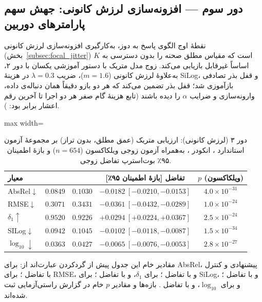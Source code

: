 \subsection{دور سوم --- افزونه‌سازی لرزش کانونی: جهش سهم پارامترهای دوربین}
\label{subsec:focal_jitter_results}

نقطهٔ اوج الگوی پاسخ به دوز، به‌کارگیری افزونه‌سازی لرزش کانونی (بخش~\ref{subsec:focal_jitter}) است که مقیاس مطلق صحنه را بدون دسترسی به $K$ اساساً غیرقابل بازیابی می‌کند. زوج مدل  متریک با دستور آموزشی یکسان با دور ۲، به‌علاوهٔ لرزش کانونی ($m=1.6$)، ضریب $\lambda=0.3$ در هزینهٔ SiLog، و قفل بذر تصادفی بازآموزی شد؛ قفل بذر تضمین می‌کند که هر دو بازو دقیقاً همان دنباله‌ی داده، وارونه‌سازی و ضرایب $\alpha$ را دیده باشند (تابع هزینهٔ گام صفر هر دو اجرا تا آخرین رقم اعشار برابر بود: ).

\begin{table}[htbp]
\centering
\caption{دور ۳ (لرزش کانونی): ارزیابی متریک (عمق مطلق، بدون تراز) بر مجموعهٔ آزمون استاندارد ، انکودر ، به‌همراه آزمون زوجی ویلکاکسون ($n=654$) و بازهٔ اطمینان ۹۵٪ بوت‌استرپ تفاضل زوجی.}
\label{tab:nyu_metric_focal}
\small
\begin{adjustbox}{max width=\textwidth}
\begin{tabular}{lcccc}
\hline
معیار & \tableproposedmodel{} & \tablecontrolmodel{} & تفاضل [بازهٔ اطمینان ۹۵٪] & $p$ (ویلکاکسون) \\ \hline
AbsRel$\downarrow$ & $\mathbf{0.0849}$ & $0.1030$ & $-0.0182\ [-0.0210, -0.0153]$ & $4.0\times10^{-31}$ \\
RMSE$\downarrow$ & $\mathbf{0.3071}$ & $0.3431$ & $-0.0361\ [-0.0432, -0.0289]$ & $1.0\times10^{-24}$ \\
$\delta_1\uparrow$ & $\mathbf{0.9520}$ & $0.9226$ & $+0.0294\ [+0.0224, +0.0367]$ & $2.5\times10^{-24}$ \\
SILog$\downarrow$ & $\mathbf{0.0942}$ & $0.1045$ & $-0.0102\ [-0.0118, -0.0087]$ & $1.5\times10^{-34}$ \\
$\log_{10}\downarrow$ & $\mathbf{0.0363}$ & $0.0427$ & $-0.0065\ [-0.0076, -0.0053]$ & $2.8\times10^{-27}$ \\ \hline
\end{tabular}
\end{adjustbox}
\end{table}

مقادیر خام این جدول پیش از گردکردن عبارت‌اند از: برای AbsRel، پیشنهادی
 و کنترل  با تفاضل ؛ برای
RMSE،  و  با تفاضل ؛ برای
$\delta_1$،  و  با تفاضل ؛
برای SiLog،  و  با تفاضل ؛
و برای $\log_{10}$،  و  با تفاضل
. بازه‌ها و مقادیر $p$ خام در گزارش راستی‌آزمایی ثبت شده‌اند.

